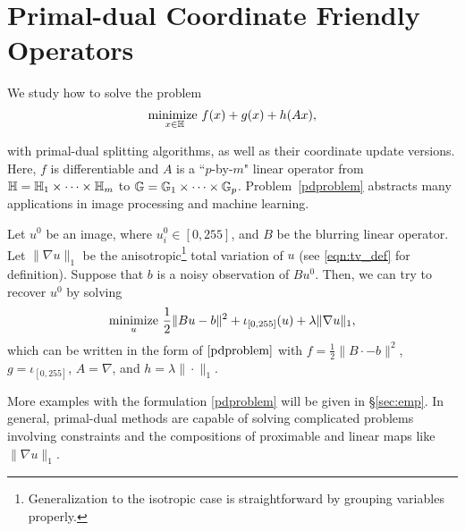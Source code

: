 \section{Primal-dual Coordinate Friendly Operators}\label{sec:p-d}
{We study how to solve the  problem
\begin{equation}
\underset{x\in\mathbb{H}}{\text{\normalfont minimize }} f(x)+g(x)+h(Ax),\label{pdproblem}
\end{equation}
{with primal-dual splitting algorithms, as well as their coordinate update versions. Here, $f$ is differentiable %
and $A$ is a ``$p$-by-$m$" linear operator from $\mathbb{H}=\mathbb{H}_1\times\cdots\times\mathbb{H}_m$ to $\mathbb{G}=\mathbb{G}_1\times\cdots\times\mathbb{G}_p$.
 Problem~\eqref{pdproblem} abstracts many applications in image processing and machine learning.
\begin{example}
Let $u^0$ be an image, where $u_i^0\in[0,255]$, and $B$ be the blurring linear operator. Let $\|\nabla u\|_1$ be the anisotropic\footnote{Generalization to the isotropic case is straightforward by grouping variables properly.} total variation of $u$ (see \eqref{eqn:tv_def} for definition). Suppose that $b$ is a noisy observation of $Bu^0$. Then, we can try to recover $u^0$ by solving
\begin{equation}
\Min_u\, \frac{1}{2}\|Bu-b\|^2+\iota_{[0,255]}(u)+\lambda\|\nabla u\|_1,
\end{equation}
which can be written in the form of $\eqref{pdproblem}$ with $f=\frac{1}{2}\|B\cdot-b\|^2$, $g=\iota_{[0,255]}$, $A=\nabla$, and $h=\lambda\|\cdot\|_{1}$.
\end{example}
More examples with the formulation \eqref{pdproblem} will be given in \S\ref{sec:emp}. %
In general, primal-dual methods are capable of solving complicated problems involving constraints and the compositions of proximable and linear maps like $\|\nabla u\|_1$.

}}
